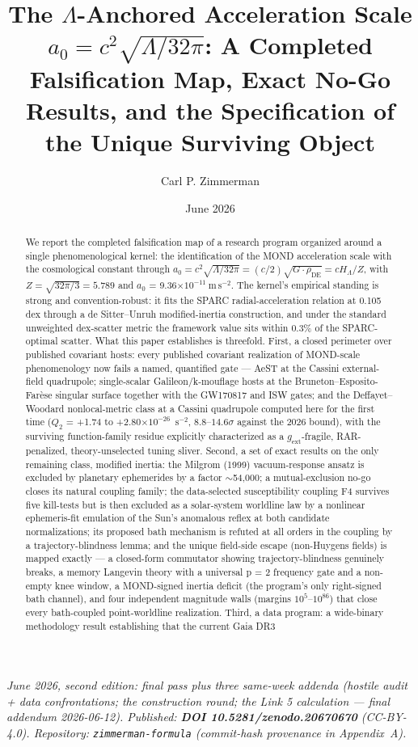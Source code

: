 \documentclass[11pt,a4paper]{article}
\title{The $\Lambda$-Anchored Acceleration Scale \texorpdfstring{$a_0 = c^2\sqrt{\Lambda/32\pi}$}{a0 = c2 sqrt(Lambda/32pi)}: A Completed Falsification Map, Exact No-Go Results, and the Specification of the Unique Surviving Object}
\author{Carl P. Zimmerman}
\date{June 2026}
\begin{document}
\maketitle

\begin{center}
\emph{June 2026, second edition: final pass plus three same-week addenda (hostile audit + data confrontations; the construction round; the Link 5 calculation --- final addendum 2026-06-12). Published: \textbf{DOI 10.5281/zenodo.20670670} (CC-BY-4.0). Repository: \texttt{zimmerman-formula} (commit-hash provenance in Appendix~A).}
\end{center}

\begin{abstract}
We report the completed falsification map of a research program organized around a single phenomenological kernel: the identification of the MOND acceleration scale with the cosmological constant through $a_0 = c^2\sqrt{\Lambda/32\pi} = (c/2)\sqrt{G\cdot\rho_{\mathrm{DE}}} = cH_\Lambda/Z$, with $Z = \sqrt{32\pi/3} = 5.789$ and $a_{0}$ = 9.36$\times10^{-11}\ \mathrm{m\,s^{-2}}$. The kernel's empirical standing is strong and convention-robust: it fits the SPARC radial-acceleration relation at 0.105 dex through a de Sitter--Unruh modified-inertia construction, and under the standard unweighted dex-scatter metric the framework value sits within 0.3\% of the SPARC-optimal scatter. What this paper establishes is threefold. First, a closed perimeter over published covariant hosts: every published covariant realization of MOND-scale phenomenology now fails a named, quantified gate --- AeST at the Cassini external-field quadrupole; single-scalar Galileon/k-mouflage hosts at the Bruneton--Esposito-Far\`ese singular surface together with the GW170817 and ISW gates; and the Deffayet--Woodard nonlocal-metric class at a Cassini quadrupole computed here for the first time ($Q_2$ = +1.74 to +2.80$\times10^{-26}$\ $\mathrm{s^{-2}}$, $8.8$--$14.6\sigma$ against the 2026 bound), with the surviving function-family residue explicitly characterized as a $g_{\mathrm{ext}}$-fragile, RAR-penalized, theory-unselected tuning sliver. Second, a set of exact results on the only remaining class, modified inertia: the Milgrom (1999) vacuum-response ansatz is excluded by planetary ephemerides by a factor $\sim$54,000; a mutual-exclusion no-go closes its natural coupling family; the data-selected susceptibility coupling F4 survives five kill-tests but is then excluded as a solar-system worldline law by a nonlinear ephemeris-fit emulation of the Sun's anomalous reflex at both candidate normalizations; its proposed bath mechanism is refuted at all orders in the coupling by a trajectory-blindness lemma; and the unique field-side escape (non-Huygens fields) is mapped exactly --- a closed-form commutator showing trajectory-blindness genuinely breaks, a memory Langevin theory with a universal p = 2 frequency gate and a non-empty knee window, a MOND-signed inertia deficit (the program's only right-signed bath channel), and four independent magnitude walls (margins $10^{5}$--$10^{86}$) that close every bath-coupled point-worldline realization. Third, a data program: a wide-binary methodology result establishing that the current Gaia DR3 
\end{abstract}
\end{document}
